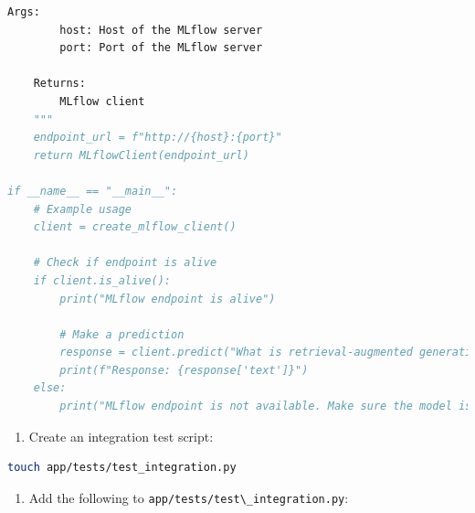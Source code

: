 \documentclass[
  screen,review,acmlarge]{acmart}
\newcommand{\passthrough}[1]{#1}
\providecommand{\tightlist}{%
  \setlength{\itemsep}{0pt}\setlength{\parskip}{0pt}}
\begin{document}
\begin{lstlisting}[language=Python]
    Args:
        host: Host of the MLflow server
        port: Port of the MLflow server
        
    Returns:
        MLflow client
    """
    endpoint_url = f"http://{host}:{port}"
    return MLflowClient(endpoint_url)

if __name__ == "__main__":
    # Example usage
    client = create_mlflow_client()
    
    # Check if endpoint is alive
    if client.is_alive():
        print("MLflow endpoint is alive")
        
        # Make a prediction
        response = client.predict("What is retrieval-augmented generation?")
        print(f"Response: {response['text']}")
    else:
        print("MLflow endpoint is not available. Make sure the model is deployed.")
\end{lstlisting}

\begin{enumerate}
\def\labelenumi{\arabic{enumi}.}
\setcounter{enumi}{2}
\tightlist
\item
  Create an integration test script:
\end{enumerate}

\begin{lstlisting}[language=bash]
touch app/tests/test_integration.py
\end{lstlisting}

\begin{enumerate}
\def\labelenumi{\arabic{enumi}.}
\setcounter{enumi}{3}
\tightlist
\item
  Add the following to \passthrough{\lstinline!app/tests/test\_integration.py!}:
\end{enumerate}
\end{document}
